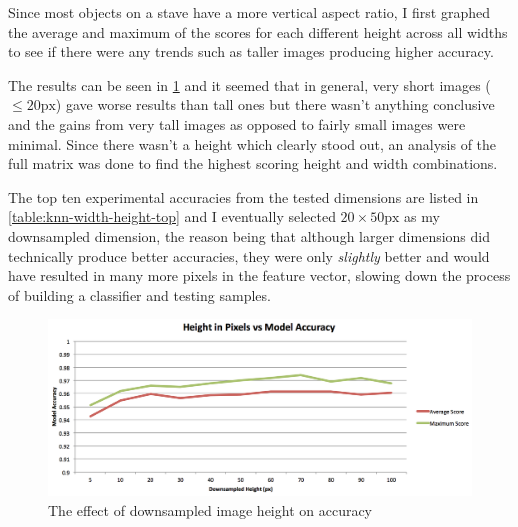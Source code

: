 Since most objects on a stave have a more vertical aspect ratio, I first graphed the average and maximum of the scores for each different height across all widths to see if there were any trends such as taller images producing higher accuracy.

The results can be seen in \cref{fig:height-downsample} and it seemed that in general, very short images ($\leq 20\text{px}$) gave worse results than tall ones but there wasn't anything conclusive and the gains from very tall images as opposed to fairly small images were minimal. Since there wasn't a height which clearly stood out, an analysis of the full matrix was done to find the highest scoring height and width combinations.

The top ten experimental accuracies from the tested dimensions are listed in \cref{table:knn-width-height-top} and I eventually selected $20\times50\text{px}$ as my downsampled dimension, the reason being that although larger dimensions did technically produce better accuracies, they were only \emph{slightly} better and would have resulted in many more pixels in the feature vector, slowing down the process of building a classifier and testing samples.

\begin{figure}[H]
  \includegraphics[width=\linewidth]{gfx/techniques/downsampling-height-vs-accuracy.png}
  \caption{The effect of downsampled image height on accuracy}
  \label{fig:height-downsample}
\end{figure}

